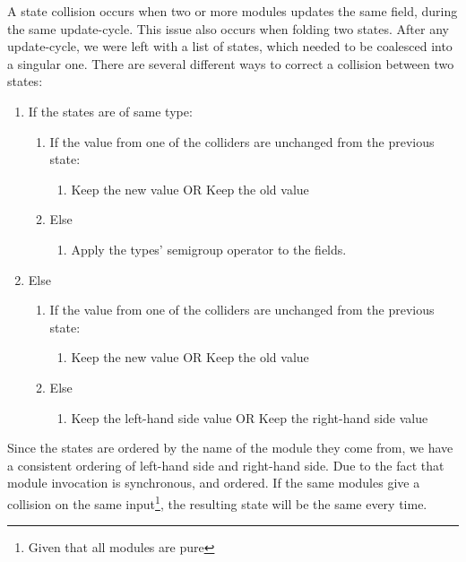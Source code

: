 A state collision occurs when two or more modules updates the same field, during
the same update-cycle. This issue also occurs when folding two states. After any
update-cycle, we were left with a list of states, which needed to be coalesced
into a singular one. There are several different ways to correct a collision
between two states:

\begin{enumerate}
  \item If the states are of same type:
    \begin{enumerate}
      \item If the value from one of the colliders are unchanged from the previous state:
        \begin{enumerate}
          \item Keep the new value OR Keep the old value
        \end{enumerate}
      \item Else
        \begin{enumerate}
          \item Apply the types' semigroup operator to the fields.
        \end{enumerate}
    \end{enumerate}
  \item Else
    \begin{enumerate}
      \item If the value from one of the colliders are unchanged from the previous state:
        \begin{enumerate}
          \item Keep the new value OR Keep the old value
        \end{enumerate}
      \item Else
        \begin{enumerate}
          \item Keep the left-hand side value OR Keep the right-hand side value
        \end{enumerate}
    \end{enumerate}
\end{enumerate}

Since the states are ordered by the name of the module they come from, we
have a consistent ordering of left-hand side and right-hand side. Due to the
fact that module invocation is synchronous, and ordered. If the same modules
give a collision on the same input\footnote{Given that all modules are pure}, the
resulting state will be the same every time.

